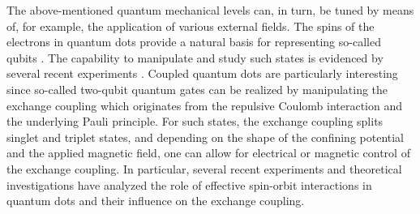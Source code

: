 \documentclass[twocolumn]{revtex4}
\begin{document}
The above-mentioned quantum mechanical levels can, in turn, be tuned by means
of, for example, the application of various external fields.  
The spins of the electrons in quantum dots
provide a natural basis for representing so-called qubits \cite{divincenzo1996}. The capability to manipulate
and study such states is evidenced by several recent experiments \cite{exp1,exp2}.
Coupled quantum dots are particularly interesting since so-called  
two-qubit quantum gates can be realized by manipulating the 
exchange coupling which originates from the repulsive Coulomb interaction 
and the underlying Pauli principle.  For such states, the exchange coupling splits singlet and triplet states, 
and depending on the shape of the confining potential and the applied magnetic field, one can allow
for electrical or magnetic control of the exchange coupling. In particular, several recent experiments and 
theoretical investigations have analyzed the role of effective spin-orbit interactions 
in quantum dots \cite{exp5,exp6,pederiva2010,spinorbit} and their influence on the exchange coupling.
\end{document}
